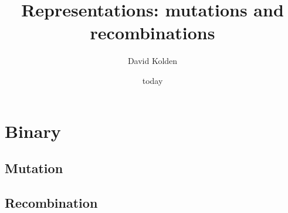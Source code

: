 \documentclass{article}
\date{today}
\author{David Kolden}
\title{Representations: mutations and recombinations}
\begin{document}
   \maketitle
   \section{Binary}
   \subsection{Mutation}
   
   \subsection{Recombination}
\end{document}

